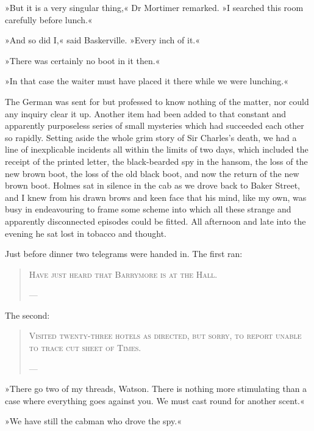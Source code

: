 »But it is a very singular thing,« Dr Mortimer remarked. »I searched this room carefully before lunch.«

»And so did I,« said Baskerville. »Every inch of it.«

»There was certainly no boot in it then.«

»In that case the waiter must have placed it there while we were lunching.«

The German was sent for but professed to know nothing of the matter, nor could any inquiry clear it up. Another item had been added to that constant and apparently purposeless series of small mysteries which had succeeded each other so rapidly. Setting aside the whole grim story of Sir Charles's death, we had a line of inexplicable incidents all within the limits of two days, which included the receipt of the printed letter, the black-bearded spy in the hansom, the loss of the new brown boot, the loss of the old black boot, and now the return of the new brown boot. Holmes sat in silence in the cab as we drove back to Baker Street, and I knew from his drawn brows and keen face that his mind, like my own, was busy in endeavouring to frame some scheme into which all these strange and apparently disconnected episodes could be fitted. All afternoon and late into the evening he sat lost in tobacco and thought.

Just before dinner two telegrams were handed in. The first ran:
\begin{samepage}
\blockquote{
\textsc{Have just heard that Barrymore is at the Hall.}
\begin{flushright}
\allowbreak---
\end{flushright} 
}
\end{samepage}

The second:
\begin{samepage}
\blockquote{
\textsc{Visited twenty-three hotels as directed, but sorry, to report unable to trace cut sheet of Times.}
\begin{flushright}
\allowbreak---
\end{flushright}
}
\end{samepage}

»There go two of my threads, Watson. There is nothing more stimulating than a case where everything goes against you. We must cast round for another scent.«

»We have still the cabman who drove the spy.«

